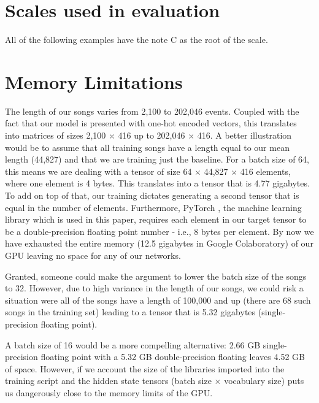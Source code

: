 \documentclass[a4paper]{book}
\begin{document}
\chapter{Scales used in evaluation} \label{appendix:scales}

All of the following examples have the note C as the root of the scale.
\begin{figure}[ht]
    \centering
    \def\svgwidth{\linewidth}
    
\end{figure}

\begin{figure}[ht]
    \centering
    \def\svgwidth{\linewidth}
    
\end{figure}

\chapter{Memory Limitations} \label{appendix:memory}

The length of our songs varies from 2,100 to 202,046 events. Coupled with the fact that our model is presented with one-hot encoded vectors, this translates into matrices of sizes 2,100 $\times$ 416 up to 202,046 $\times$ 416. A better illustration would be to assume that all training songs have a length equal to our mean length (44,827) and that we are training just the baseline. For a batch size of 64, this means we are dealing with a tensor of size 64 $\times$ 44,827 $\times$ 416 elements, where one element is 4 bytes. This translates into a tensor that is 4.77 gigabytes. To add on top of that, our training dictates generating a second tensor that is equal in the number of elements. Furthermore, PyTorch \parencite{paszke_automatic_2017}, the machine learning library which is used in this paper, requires each element in our target tensor to be a double-precision floating point number - i.e., 8 bytes per element. By now we have exhausted the entire memory (12.5 gigabytes in Google Colaboratory) of our GPU leaving no space for any of our networks.

Granted, someone could make the argument to lower the batch size of the songs to 32. However, due to high variance in the length of our songs, we could risk a situation were all of the songs have a length of 100,000 and up (there are 68 such songs in the training set) leading to a tensor that is 5.32 gigabytes (single-precision floating point).

A batch size of 16 would be a more compelling alternative: 2.66 GB single-precision floating point with a 5.32 GB double-precision floating leaves 4.52 GB of space. However, if we account the size of the libraries imported into the training script and the hidden state tensors (batch size $\times$ vocabulary size) puts us dangerously close to the memory limits of the GPU.

\end{document}
